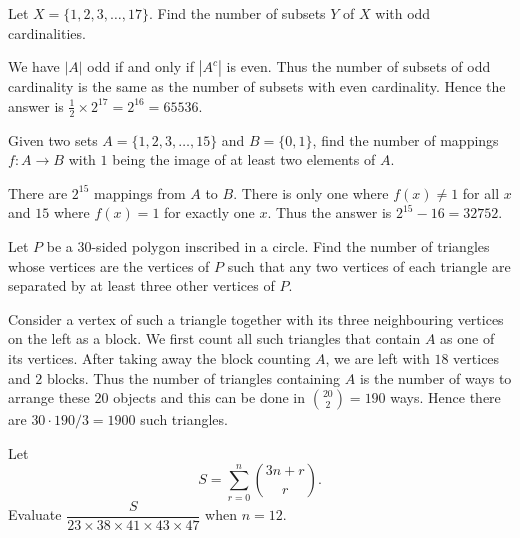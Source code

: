 \begin{prbm}
Let $X=\{1,2,3,\dots,17\}$. Find the number of subsets $Y$ of $X$ with odd cardinalities.
\end{prbm}

\begin{solution}
We have $|A|$ odd if and only if $|A^c|$ is even. Thus the number of subsets of odd cardinality is the same as the number of subsets with even cardinality. Hence the answer is $\frac{1}{2}\times2^{17}=2^{16}=65536$.
\end{solution}

\begin{prbm}
Given two sets $A=\{1,2,3,\dots,15\}$ and $B=\{0,1\}$, find the number of mappings $f:A\to B$ with $1$ being the image of at least two elements of $A$.
\end{prbm}

\begin{solution}
There are $2^{15}$ mappings from $A$ to $B$. There is only one where $f(x)\neq1$ for all $x$ and $15$ where $f(x)=1$ for exactly one $x$. Thus the answer is $2^{15}-16=\boxed{32752}$.
\end{solution}

\begin{prbm}
Let $P$ be a 30-sided polygon inscribed in a circle. Find the number of triangles whose vertices are the vertices of $P$ such that any two vertices of each triangle are separated by at least three other vertices of $P$.
\end{prbm}

\begin{solution}
Consider a vertex of such a triangle together with its three neighbouring vertices on the left as a block. We first count all such triangles that contain $A$ as one of its vertices. After taking away the block counting $A$, we are left with $18$ vertices and $2$ blocks. Thus the number of triangles containing $A$ is the number of ways to arrange these $20$ objects and this can be done in $\binom{20}{2}=190$ ways. Hence there are $30\cdot190/3=\boxed{1900}$ such triangles.
\end{solution}

\begin{prbm}
Let
\[S=\sum_{r=0}^n\binom{3n+r}{r}.\]
Evaluate $\dfrac{S}{23\times38\times41\times43\times47}$ when $n=12$.
\end{prbm}

